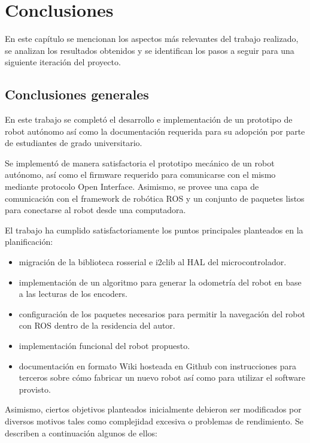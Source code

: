 
\chapter{Conclusiones}

\label{Capitulo5}

En este capítulo se mencionan los aspectos más relevantes del trabajo realizado, se analizan los resultados obtenidos y se identifican los pasos a seguir para una siguiente iteración del proyecto.

\section{Conclusiones generales}

En este trabajo se completó el desarrollo e implementación de un prototipo de robot autónomo así como la documentación requerida para su adopción por parte de estudiantes de grado universitario.

Se implementó de manera satisfactoria el prototipo mecánico de un robot autónomo, así como el firmware requerido para comunicarse con el mismo mediante protocolo Open Interface. Asimismo, se provee una capa de comunicación con el framework de robótica ROS y un conjunto de paquetes listos para conectarse al robot desde una computadora.

El trabajo ha cumplido satisfactoriamente los puntos principales planteados en la planificación:

\begin{itemize}
    \item migración de la biblioteca rosserial e i2clib al HAL del microcontrolador.
    \item implementación de un algoritmo para generar la odometría del robot en base a las lecturas de los encoders.
    \item configuración de los paquetes necesarios para permitir la navegación del robot con ROS dentro de la residencia del autor.
    \item implementación funcional del robot propuesto.
    \item documentación en formato Wiki hosteada en Github con instrucciones para terceros sobre cómo fabricar un nuevo robot así como para utilizar el software provisto.
\end{itemize}

Asimismo, ciertos objetivos planteados inicialmente debieron ser modificados por diversos motivos tales como complejidad excesiva o problemas de rendimiento. Se describen a continuación algunos de ellos:

